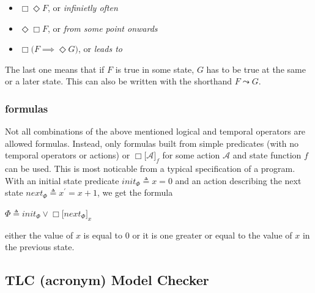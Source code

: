 \documentclass[english, biblatex, digitaloutput]{kththesis}
\begin{document}
\begin{itemize}
	\item $\Box\Diamond F$, or \textit{infinietly often}
	\item $\Diamond\Box F$, or \textit{from some point onwards}
	\item $\Box \lparen F \implies \Diamond G \rparen$, or \textit{leads to}
\end{itemize}

The last one means that if $F$ is true in some state, $G$ has to be true at the same or a later state. This can also be written with the shorthand $F \leadsto G$.

\subsubsection{ formulas}

Not all combinations of the above mentioned logical and temporal operators are allowed  formulas. Instead, only formulas built from simple predicates (with no temporal operators or actions) or $\Box \lbrack \mathcal{A}  \rbrack_{f}$ for some action $\mathcal{A}$ and state function $f$ can be used. This is most noticable from a typical  specification of a program. With an initial state predicate $init_\Phi \triangleq x = 0$ and an action describing the next state $next_\Phi \triangleq x^\prime = x + 1$, we get the  formula

\begin{math}
	\Phi \triangleq init_\Phi \lor \Box \lbrack next_\Phi \rbrack_x
\end{math}

\ie either the value of $x$ is equal to 0 or it is one greater or equal to the value of $x$ in the previous state.

\subsection{TLC \textbf{(acronym)} Model Checker}
\end{document}

